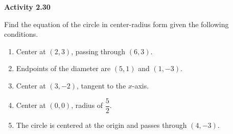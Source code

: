 \vspace{0.3ex}
\noindent\textbf{Activity 2.30}

\vspace{0.2ex}

Find the equation of the circle in center-radius form given the following conditions.

\begin{enumerate}
    \item Center at $(2, 3)$, passing through $(6, 3)$.
    \item Endpoints of the diameter are $(5, 1)$ and $(1, -3)$.
    \item Center at $(3, -2)$, tangent to the $x$-axis.
    \item Center at $(0,0)$, radius of $\dfrac{5}{2}$.
    \item The circle is centered at the origin and passes through $(4, -3)$.
\end{enumerate}
